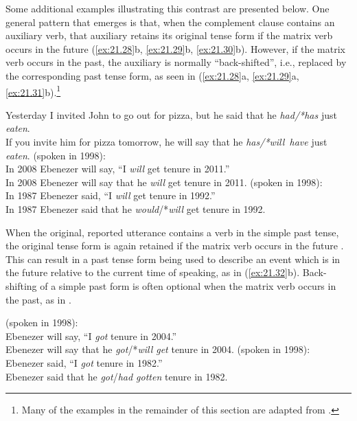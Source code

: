 Some additional examples illustrating this contrast are presented below. One general pattern that emerges is that, when the complement clause contains an auxiliary verb, that auxiliary retains its original tense form if the matrix verb occurs in the future (\ref{ex:21.28}b, \ref{ex:21.29}b, \ref{ex:21.30}b). However, if the matrix verb occurs in the past, the auxiliary is normally “back-shifted”, i.e., replaced by the corresponding past tense form, as seen in (\ref{ex:21.28}a, \ref{ex:21.29}a, \ref{ex:21.31}b).\footnote{Many of the examples in the remainder of this section are adapted from \citet{Declerck1991}.}


\ea \label{ex:21.29}
\ea Yesterday I invited John to go out for pizza, but he said that he \textit{had/*has} just \textit{eaten}.\\
\ex If you invite him for pizza tomorrow, he will say that he \textit{has/*will~have} just \textit{eaten}.
    \z
\ex \label{ex:21.30}
(spoken in 1998):\\
\ea  In 2008 Ebenezer will say, “I \textit{will} get tenure in 2011.”\\
\ex  In 2008 Ebenezer will say that he \textit{will} get tenure in 2011.
     \z
\ex\label{ex:21.31}(spoken in 1998):\\
\ea In 1987 Ebenezer said, “I \textit{will} get tenure in 1992.”\\
\ex In 1987 Ebenezer said that he \textit{would}/*\textit{will} get tenure in 1992.
    \z
\z


When the original, reported utterance contains a verb in the simple past tense, the original tense form is again retained if the matrix verb occurs in the future . This can result in a past tense form being used to describe an event which is in the future relative to the current time of speaking, as in (\ref{ex:21.32}b). Back-shifting of a simple past form is often optional when the matrix verb occurs in the past, as in .


\ea \label{ex:21.32}
(spoken in 1998):\\
 Ebenezer will say, “I \textit{got} tenure in 2004.”\\
 Ebenezer will say that he \textit{got}/*\textit{will get} tenure in 2004.
     \z
\ex \label{ex:21.33}
(spoken in 1998):\\
 Ebenezer said, “I \textit{got} tenure in 1982.”\\
 Ebenezer said that he \textit{got}/\textit{had gotten} tenure in 1982.
     \z
\z


